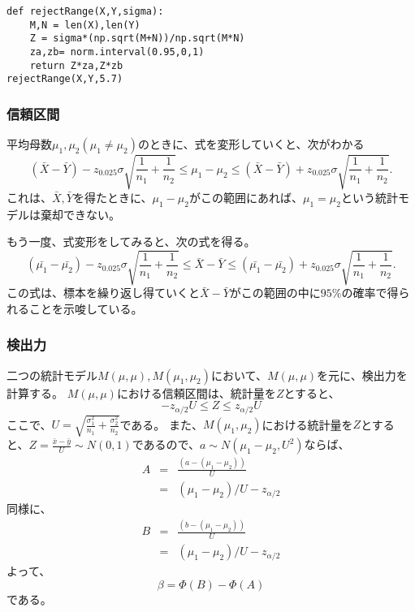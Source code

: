 \documentclass[a4paper,11pt,dvipdfmx]{jsarticle}
\begin{document}
\begin{lstlisting}
def rejectRange(X,Y,sigma):
    M,N = len(X),len(Y)
    Z = sigma*(np.sqrt(M+N))/np.sqrt(M*N)
    za,zb= norm.interval(0.95,0,1)
    return Z*za,Z*zb
rejectRange(X,Y,5.7)
\end{lstlisting}
\subsubsection{信頼区間}
平均母数$\mu_1,\mu_2(\mu_1\neq \mu_2)$のときに、式を変形していくと、次がわかる
\begin{equation*}
    (\bar{X}-\bar{Y})-z_{0.025}\sigma\sqrt{\frac{1}{n_1}+\frac{1}{n_2}} \leq \mu_1-\mu_2 \leq (\bar{X}-\bar{Y})+z_{0.025}\sigma\sqrt{\frac{1}{n_1}+\frac{1}{n_2}}.
\end{equation*}
これは、$\bar{X},\bar{Y}$を得たときに、$\mu_1-\mu_2$がこの範囲にあれば、$\mu_1=\mu_2$という統計モデルは棄却できない。

もう一度、式変形をしてみると、次の式を得る。
\begin{equation*}
    (\bar{\mu_1}-\bar{\mu_2})-z_{0.025}\sigma\sqrt{\frac{1}{n_1}+\frac{1}{n_2}} \leq \bar{X}-\bar{Y} \leq (\bar{\mu_1}-\bar{\mu_2})+z_{0.025}\sigma\sqrt{\frac{1}{n_1}+\frac{1}{n_2}}.
\end{equation*}
この式は、標本を繰り返し得ていくと$\bar{X}-\bar{Y}$がこの範囲の中に$95\%$の確率で得られることを示唆している。

\subsubsection{検出力}
二つの統計モデル$M(\mu,\mu),M(\mu_1,\mu_2)$において、$M(\mu,\mu)$を元に、検出力を計算する。
$M(\mu,\mu)$における信頼区間は、統計量を$Z$とすると、
\begin{equation*}
    -z_{\alpha/2}U \leq Z\leq z_{\alpha/2}U
\end{equation*}
ここで、$U=\sqrt{\frac{\sigma^2_1}{n_1}+\frac{\sigma^2_2}{n_2}}$である。
また、$M(\mu_1,\mu_2)$における統計量を$Z$とすると、$Z = \frac{\bar{x}-\bar{y}}{U}\sim N(0,1)$であるので、$a \sim N(\mu_1-\mu_2,U^2)$ならば、
\begin{eqnarray*}
    A &=& \frac{(a-(\mu_1-\mu_2))}{U} \\
      &=& (\mu_1-\mu_2)/U-z_{\alpha/2}
\end{eqnarray*}
同様に、
\begin{eqnarray*}
    B &=& \frac{(b-(\mu_1-\mu_2))}{U} \\
      &=& (\mu_1-\mu_2)/U-z_{\alpha/2}
\end{eqnarray*}
よって、
\begin{equation*}
    \beta = \varPhi(B)-\varPhi(A)
\end{equation*}
である。
\end{document}
